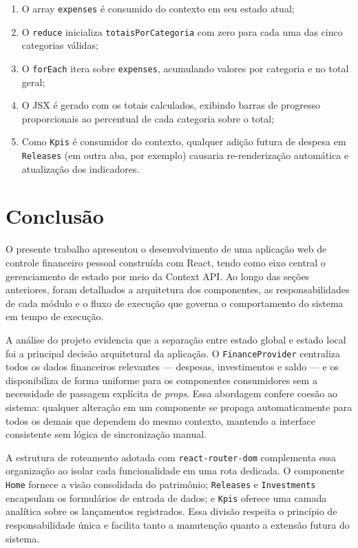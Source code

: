 \documentclass{article}
\begin{document}
\begin{enumerate}
  \item O array \texttt{expenses} é consumido do contexto em seu estado atual;
  \item O \texttt{reduce} inicializa \texttt{totaisPorCategoria} com zero para cada uma das cinco categorias válidas;
  \item O \texttt{forEach} itera sobre \texttt{expenses}, acumulando valores por categoria e no total geral;
  \item O JSX é gerado com os totais calculados, exibindo barras de progresso proporcionais ao percentual de cada categoria sobre o total;
  \item Como \texttt{Kpis} é consumidor do contexto, qualquer adição futura de despesa em \texttt{Releases} (em outra aba, por exemplo) causaria re-renderização automática e atualização dos indicadores.
\end{enumerate}

\section{Conclusão}

O presente trabalho apresentou o desenvolvimento de uma aplicação web de controle financeiro pessoal construída com React, tendo como eixo central o gerenciamento de estado por meio da Context API. Ao longo das seções anteriores, foram detalhados a arquitetura dos componentes, as responsabilidades de cada módulo e o fluxo de execução que governa o comportamento do sistema em tempo de execução.

A análise do projeto evidencia que a separação entre estado global e estado local foi a principal decisão arquitetural da aplicação. O \texttt{FinanceProvider} centraliza todos os dados financeiros relevantes — despesas, investimentos e saldo — e os disponibiliza de forma uniforme para os componentes consumidores sem a necessidade de passagem explícita de \textit{props}. Essa abordagem confere coesão ao sistema: qualquer alteração em um componente se propaga automaticamente para todos os demais que dependem do mesmo contexto, mantendo a interface consistente sem lógica de sincronização manual.

A estrutura de roteamento adotada com \texttt{react-router-dom} complementa essa organização ao isolar cada funcionalidade em uma rota dedicada. O componente \texttt{Home} fornece a visão consolidada do patrimônio; \texttt{Releases} e \texttt{Investments} encapsulam os formulários de entrada de dados; e \texttt{Kpis} oferece uma camada analítica sobre os lançamentos registrados. Essa divisão respeita o princípio de responsabilidade única e facilita tanto a manutenção quanto a extensão futura do sistema.
\end{document}
